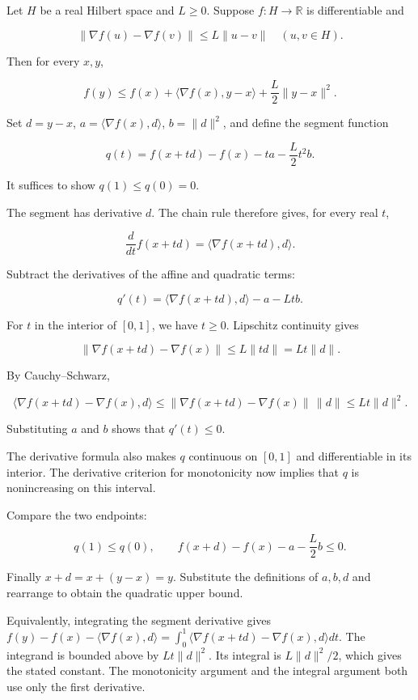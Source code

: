 \documentclass[11pt,a4paper]{report}
\begin{document}
Let \(H\) be a real Hilbert space and \(L\ge0\). Suppose \(f:H\to\mathbb R\) is differentiable and

\[\|\nabla f(u)-\nabla f(v)\|\le L\|u-v\|\quad(u,v\in H).\]

Then for every \(x,y\),

\[f(y)\le f(x)+\langle\nabla f(x),y-x\rangle+\frac L2\|y-x\|^2.\]

Set \(d=y-x\), \(a=\langle\nabla f(x),d\rangle\), \(b=\|d\|^2\), and define the segment function

\[q(t)=f(x+td)-f(x)-ta-\frac L2t^2b.\]

It suffices to show \(q(1)\le q(0)=0\).



The segment has derivative \(d\). The chain rule therefore gives, for every real \(t\),

\[\frac{d}{dt}f(x+td)=\langle\nabla f(x+td),d\rangle.\]

Subtract the derivatives of the affine and quadratic terms:

\[q'(t)=\langle\nabla f(x+td),d\rangle-a-Ltb.\]

For \(t\) in the interior of \([0,1]\), we have \(t\ge0\). Lipschitz continuity gives

\[\|\nabla f(x+td)-\nabla f(x)\|\le L\|td\|=Lt\|d\|.\]

By Cauchy–Schwarz,

\[\langle\nabla f(x+td)-\nabla f(x),d\rangle\le\|\nabla f(x+td)-\nabla f(x)\|\,\|d\|\le Lt\|d\|^2.\]

Substituting \(a\) and \(b\) shows that \(q'(t)\le0\).



The derivative formula also makes \(q\) continuous on \([0,1]\) and differentiable in its interior. The derivative criterion for monotonicity now implies that \(q\) is nonincreasing on this interval.



Compare the two endpoints:

\[q(1)\le q(0),\qquad f(x+d)-f(x)-a-\frac L2b\le0.\]

Finally \(x+d=x+(y-x)=y\). Substitute the definitions of \(a,b,d\) and rearrange to obtain the quadratic upper bound.



Equivalently, integrating the segment derivative gives \(f(y)-f(x)-\langle\nabla f(x),d\rangle=\int_0^1\langle\nabla f(x+td)-\nabla f(x),d\rangle dt\). The integrand is bounded above by \(Lt\|d\|^2\). Its integral is \(L\|d\|^2/2\), which gives the stated constant. The monotonicity argument and the integral argument both use only the first derivative.
\end{document}
